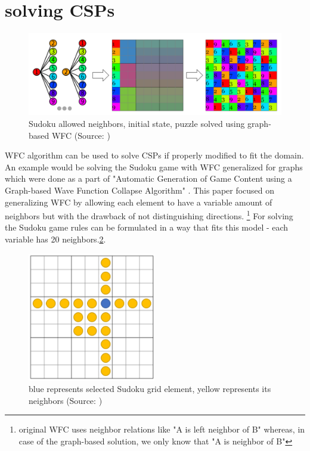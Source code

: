 \documentclass[shortabstract, english, inz]{iithesis}
\begin{document}
\section{solving CSPs}
\begin{figure}[H]
\centering
\includegraphics[width=1\textwidth, angle=0]{images/sudoku_solver.png}
\caption{Sudoku allowed neighbors, initial state, puzzle solved using graph-based WFC (Source: \cite{GraphBased})}
\label{fig:sudoku_solver}
\end{figure}
WFC algorithm can be used to solve CSPs if properly modified to fit the domain. An example would be solving the Sudoku game with WFC generalized for graphs which were done as a part of "Automatic Generation of Game Content using a Graph-based Wave Function Collapse Algorithm" \cite{GraphBased}. This paper focused on generalizing WFC by allowing each element to have a variable amount of neighbors but with the drawback of not distinguishing directions. \footnote{original WFC uses neighbor relations like "A is left neighbor of B" whereas, in case of the graph-based solution, we only know that "A is neighbor of B"} For solving the Sudoku game rules can be formulated in a way that fits this model - each variable has 20 neighbors.\ref{fig:sudoku_neighbors}.
\begin{figure}[H]
\centering
\includegraphics[width=0.50\textwidth, angle=0]{images/sudoku_neighbors.png}
\caption{blue represents selected Sudoku grid element, yellow represents its neighbors (Source: \cite{GraphBased})}
\label{fig:sudoku_neighbors}
\end{figure}
\end{document}
